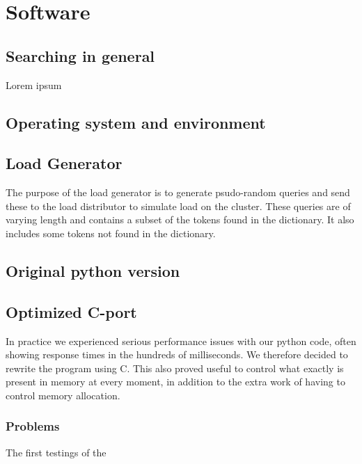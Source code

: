 
\section{Software}
\subsection{Searching in general}
Lorem ipsum\cite{IntroIR}
\subsection{Operating system and environment}
\subsection{Load Generator}
The purpose of the load generator is to generate psudo-random queries and send these to the load distributor to simulate load on the cluster. These queries are of varying length and contains a subset of the tokens found in the dictionary. It also includes some tokens not found in the dictionary. 








\subsection{Original python version}

\subsection{Optimized C-port}
In practice we experienced serious performance issues with our python code, often showing response times in the hundreds of milliseconds. We therefore decided to rewrite the program using C. This also proved useful to control what exactly is present in memory at every moment, in addition to the extra work of having to control memory allocation.
\subsubsection{Problems}
The first testings of the

